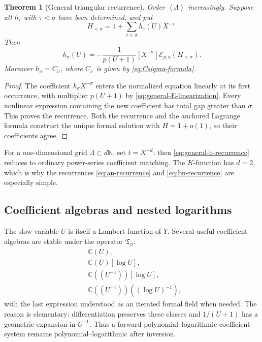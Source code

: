 \documentclass[11pt,oneside]{article}
\theoremstyle{plain}
\newtheorem{theorem}{Theorem}[section]
\theoremstyle{definition}
\theoremstyle{remark}
\newcommand{\C}{\mathbb{C}}
\newcommand{\N}{\mathbb{N}}
\newcommand{\calE}{\mathcal{E}}
\newcommand{\angles}[1]{\left\langle #1\right\rangle}
\begin{document}
\begin{theorem}[General triangular recurrence]
\label{thm:general-triangular}
Order \(\angles{\Lambda}\) increasingly.  Suppose all
\(h_\tau\) with \(\tau<\sigma\) have been determined, and put
\[
 H_{<\sigma}=1+\sum_{\tau<\sigma}h_\tau(U)X^{-\tau}.
\]
Then
\begin{equation}
 \boxed{
 h_\sigma(U)=-\frac1{p(U+1)}
 [X^{-\sigma}]\calE_{p,a}(H_{<\sigma}).}
 \label{eq:general-h-recurrence}
\end{equation}
Moreover \(h_\sigma=C_\sigma\), where \(C_\sigma\) is given by
\eqref{eq:Csigma-formula}.
\end{theorem}

\begin{proof}
The coefficient \(h_\sigma X^{-\sigma}\) enters the normalized equation
linearly at its first occurrence, with multiplier \(p(U+1)\) by
\eqref{eq:general-E-linearization}.  Every nonlinear expression containing the
new coefficient has total gap greater than \(\sigma\).  This proves the
recurrence.  Both the recurrence and the anchored Lagrange formula construct
the unique formal solution with \(H=1+o(1)\), so their coefficients agree.
\end{proof}

For a one-dimensional grid \(\Lambda\subset d\N\), set \(t=X^{-d}\); then
\eqref{eq:general-h-recurrence} reduces to ordinary power-series coefficient
matching.  The \(K\)-function has \(d=2\), which is why the recurrences
\eqref{eq:an-recurrence} and \eqref{eq:bn-recurrence} are especially simple.

\subsection{Coefficient algebras and nested logarithms}

The slow variable \(U\) is itself a Lambert function of \(Y\).  Several useful
coefficient algebras are stable under the operator \(\mathfrak{T}_\mu\):
\begin{align*}
 &\C(U),\\
 &\C(U)[\log U],\\
 &\C((U^{-1}))[\log U],\\
 &\C((U^{-1}))((\log U)^{-1}),
\end{align*}
with the last expression understood as an iterated formal field when needed.
The reason is elementary: differentiation preserves these classes and
\(1/(U+1)\) has a geometric expansion in \(U^{-1}\).  Thus a forward
polynomial--logarithmic coefficient system remains polynomial--logarithmic
after inversion.
\end{document}
